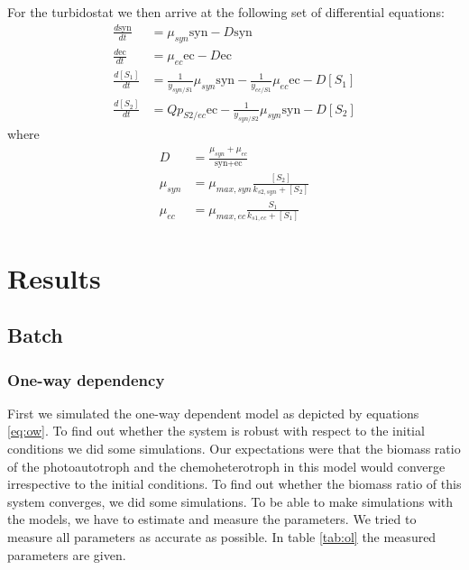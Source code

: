 \documentclass[10pt]{report}
\begin{document}
For the turbidostat we then arrive at the following set of differential equations:
\begin{align} \label{eq:turb}
 \frac{d\text{syn}}{dt} &= \mu_{syn}\text{syn} - D\text{syn}\\
 \frac{d\text{ec}}{dt} &= \mu_{ec}\text{ec} - D\text{ec} \\
 \frac{d[S_1]}{dt} &= \frac{1}{y_{syn/S1}} \mu_{syn} \text{syn} - \frac{1}{y_{ec/S1}} \mu_{ec} \text{ec} -D[S_1]\\
 \frac{d[S_2]}{dt} &=  Qp_{S2/ec}\text{ec} - \frac{1}{y_{syn/S2}} \mu_{syn} \text{syn} -D[S_2]
\end{align}
where
\begin{align}
 D &= \frac{\mu_{syn} + \mu_{ec}}{\text{syn}+\text{ec}}\\
 \mu_{syn} &= \mu_{max,syn} \frac{[S_2]}{k_{s2,syn}+[S_{2}]}\\
 \mu_{ec} &= \mu_{max,ec} \frac{S_1}{k_{s1,ec}+[S_1]} \label{eq:turbend}
\end{align}



\section{Results}
\subsection{Batch}
\subsubsection{One-way dependency}
First we simulated the one-way dependent model as depicted by equations \ref{eq:ow}. 
To find out whether the system is robust with respect to the initial conditions we did some simulations. Our expectations were that the biomass ratio of the photoautotroph and the chemoheterotroph in this model would converge irrespective to the initial conditions.
To find out whether the biomass ratio of this system converges, we did some simulations. To be able to make simulations with the models, we have to estimate and measure the parameters.
We tried to measure all parameters as accurate as possible. In table \ref{tab:ol} the measured parameters are given.
\end{document}
